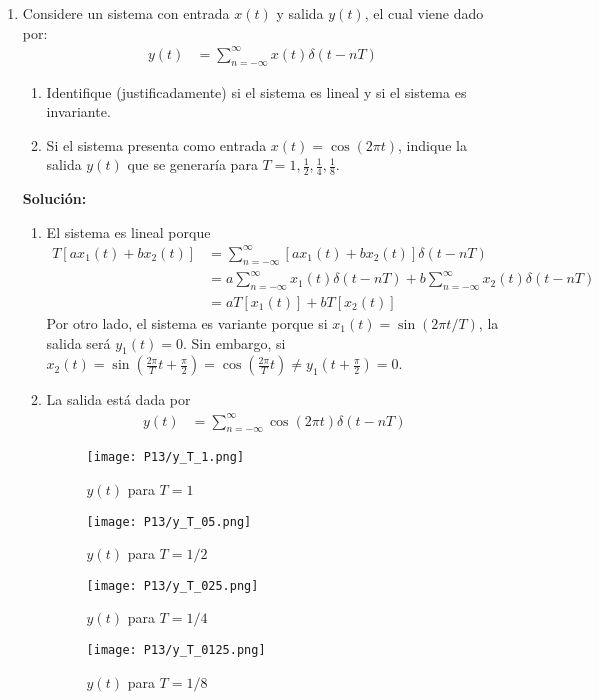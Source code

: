 \documentclass[letterpaper, 12pt]{article}
\newif\ifanswers
\begin{document}
\begin{enumerate}
    \item Considere un sistema con entrada $x(t)$ y salida $y(t)$, el cual viene dado por:
    \begin{align*}
        y(t) &= \sum_{n=-\infty}^{\infty} x(t) \delta(t-n T)
    \end{align*}
    
    \begin{enumerate}
        \item Identifique (justificadamente) si el sistema es lineal y si el sistema es invariante.
        \item Si el sistema presenta como entrada $x(t) = \cos(2\pi t)$, indique la salida $y(t)$ que se generaría para $T=1, \frac{1}{2}, \frac{1}{4}, \frac{1}{8}$.
    \end{enumerate}
    \ifanswers
    {\color{red}
    \textbf{Solución:}

    \begin{enumerate}
        \item El sistema es lineal porque
        \begin{align*}
            T[ax_1(t)+bx_2(t)] &= \sum_{n=-\infty}^{\infty} [ax_1(t)+bx_2(t)]\delta(t-nT) \\
            &= a \sum_{n=-\infty}^{\infty} x_1(t) \delta(t-n T) + b \sum_{n=-\infty}^{\infty} x_2(t) \delta(t-n T) \\
            &= a T[x_1(t)] + b T[x_2(t)]
        \end{align*}
        Por otro lado, el sistema es variante porque si $x_1(t)=\sin(2\pi t/T)$, la salida será $y_1(t)=0$. Sin embargo, si $x_2(t)=\sin(\frac{2\pi}{T} t+\frac{\pi}{2}) = \cos(\frac{2\pi}{T}t) \neq y_1(t+\frac{\pi}{2})=0$.
        \item La salida está dada por
        \begin{align*}
            y(t) &= \sum_{n=-\infty}^{\infty} \cos(2\pi t) \delta(t-n T)
        \end{align*}

        \begin{figure}[H]
            \centering
            \texttt{[image: P13/y\_T\_1.png]}
            \caption{$y(t)$ para $T=1$}
            \label{y1}
        \end{figure}
        \begin{figure}[H]
            \centering
            \texttt{[image: P13/y\_T\_05.png]}
            \caption{$y(t)$ para $T=1/2$}
            \label{y1}
        \end{figure}
        \begin{figure}[H]
            \centering
            \texttt{[image: P13/y\_T\_025.png]}
            \caption{$y(t)$ para $T=1/4$}
            \label{y1}
        \end{figure}
        \begin{figure}[H]
            \centering
            \texttt{[image: P13/y\_T\_0125.png]}
            \caption{$y(t)$ para $T=1/8$}
            \label{y1}
        \end{figure}
    \end{enumerate}
    
}
\end{enumerate}
\end{document}
